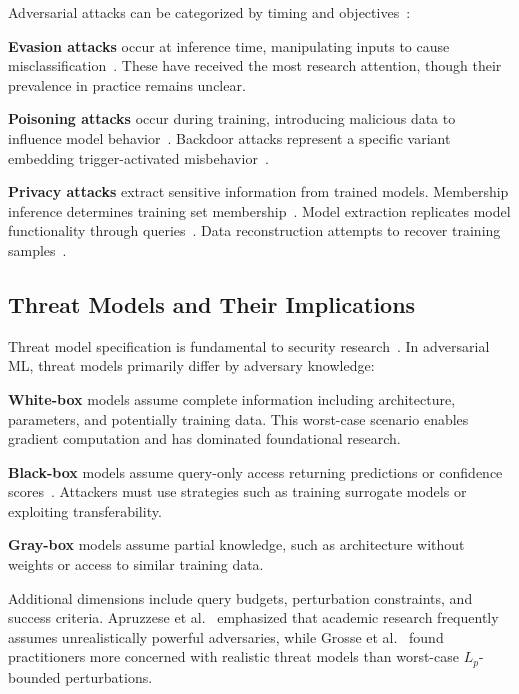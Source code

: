 \documentclass[11pt,a4paper]{article}
\begin{document}
Adversarial attacks can be categorized by timing and objectives~\citep{biggio2018wild}:

\textbf{Evasion attacks} occur at inference time, manipulating inputs to cause misclassification~\citep{szegedy2013intriguing, goodfellow2014explaining}. These have received the most research attention, though their prevalence in practice remains unclear.

\textbf{Poisoning attacks} occur during training, introducing malicious data to influence model behavior~\citep{biggio2012poisoning}. Backdoor attacks represent a specific variant embedding trigger-activated misbehavior~\citep{gu2017badnets}.

\textbf{Privacy attacks} extract sensitive information from trained models. Membership inference determines training set membership~\citep{shokri2017membership, carlini2022membership}. Model extraction replicates model functionality through queries~\citep{tramer2016stealing, jagielski2020high}. Data reconstruction attempts to recover training samples~\citep{carlini2021extracting}.

\subsection{Threat Models and Their Implications}

Threat model specification is fundamental to security research~\citep{carlini2019evaluating}. In adversarial ML, threat models primarily differ by adversary knowledge:

\textbf{White-box} models assume complete information including architecture, parameters, and potentially training data. This worst-case scenario enables gradient computation and has dominated foundational research.

\textbf{Black-box} models assume query-only access returning predictions or confidence scores~\citep{papernot2017practical}. Attackers must use strategies such as training surrogate models or exploiting transferability.

\textbf{Gray-box} models assume partial knowledge, such as architecture without weights or access to similar training data.

Additional dimensions include query budgets, perturbation constraints, and success criteria. Apruzzese et al.~\citep{apruzzese2022real} emphasized that academic research frequently assumes unrealistically powerful adversaries, while Grosse et al.~\citep{grosse2024practical} found practitioners more concerned with realistic threat models than worst-case $L_p$-bounded perturbations.
\end{document}
